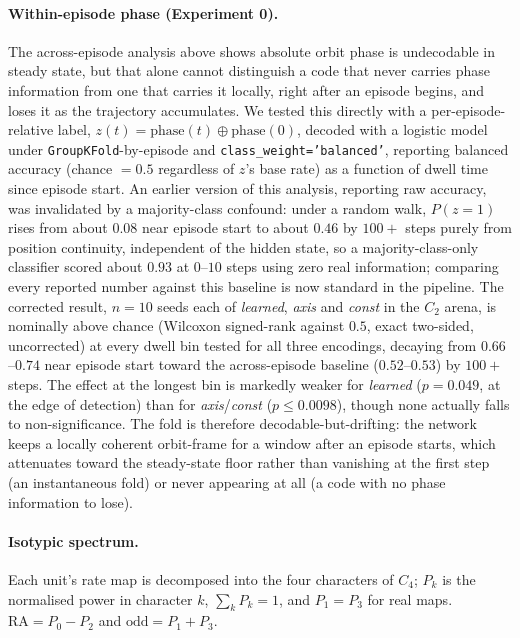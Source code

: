 \paragraph{Within-episode phase (Experiment 0).} The across-episode analysis above shows absolute
orbit phase is undecodable in steady state, but that alone cannot distinguish a code that never
carries phase information from one that carries it locally, right after an episode begins, and
loses it as the trajectory accumulates. We tested this directly with a per-episode-relative label,
$z(t) = \text{phase}(t) \oplus \text{phase}(0)$, decoded with a logistic model under
\texttt{GroupKFold}-by-episode and \texttt{class\_weight='balanced'}, reporting balanced accuracy
(chance $=0.5$ regardless of $z$'s base rate) as a function of dwell time since episode start. An
earlier version of this analysis, reporting raw accuracy, was invalidated by a majority-class
confound: under a random walk, $P(z=1)$ rises from about $0.08$ near episode start to about $0.46$
by $100+$ steps purely from position continuity, independent of the hidden state, so a
majority-class-only classifier scored about $0.93$ at $0$--$10$ steps using zero real information;
comparing every reported number against this baseline is now standard in the pipeline.
The corrected result, $n=10$ seeds each of \textit{learned}, \textit{axis} and \textit{const} in
the $C_2$ arena, is nominally above chance (Wilcoxon signed-rank against $0.5$, exact two-sided,
uncorrected) at every dwell bin tested for all three encodings, decaying from
$0.66$--$0.74$ near episode start toward the across-episode baseline ($0.52$--$0.53$) by
$100+$ steps. The effect at the longest bin is markedly weaker for \textit{learned}
($p=0.049$, at the edge of detection) than for \textit{axis}/\textit{const} ($p \le 0.0098$),
though none actually falls to non-significance. The fold is therefore decodable-but-drifting: the
network keeps a locally coherent orbit-frame for a window after an episode starts, which
attenuates toward the steady-state floor rather than vanishing at the first step (an instantaneous
fold) or never appearing at all (a code with no phase information to lose).

\paragraph{Isotypic spectrum.} Each unit's rate map is decomposed into the four characters of
$C_4$; $P_k$ is the normalised power in character $k$, $\sum_k P_k = 1$, and $P_1 = P_3$ for real
maps. $\mathrm{RA} = P_0 - P_2$ and $\mathrm{odd} = P_1 + P_3$.

